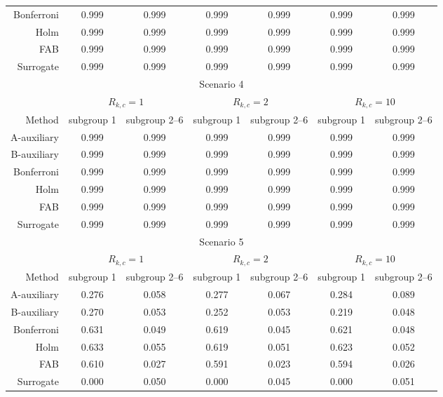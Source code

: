 \begin{tabular}{rcccccc}
 Bonferroni &0.999 & 0.999 &0.999 & 0.999 &0.999 & 0.999 \\ 
Holm &0.999 & 0.999 &0.999 & 0.999 &0.999 & 0.999 \\ 
FAB &0.999 & 0.999 &0.999 & 0.999 &0.999 & 0.999 \\ 
Surrogate &0.999 & 0.999 &0.999 & 0.999 &0.999 & 0.999 \\ 
\bottomrule 
\multicolumn{7}{c}{Scenario 4}\\ 
\midrule 
& \multicolumn{2}{c}{$R_{k,c} = 1$} & \multicolumn{2}{c}{$R_{k,c} = 2$} & \multicolumn{2}{c}{$R_{k,c} = 10$} \\ 
Method  & subgroup 1 & subgroup 2--6 & subgroup 1 & subgroup 2--6 & subgroup 1 & subgroup 2--6 \\ 
A-auxiliary &0.999 & 0.999 &0.999 & 0.999 &0.999 & 0.999 \\ 
 B-auxiliary &0.999 & 0.999 &0.999 & 0.999 &0.999 & 0.999 \\ 
 Bonferroni &0.999 & 0.999 &0.999 & 0.999 &0.999 & 0.999 \\ 
Holm &0.999 & 0.999 &0.999 & 0.999 &0.999 & 0.999 \\ 
FAB &0.999 & 0.999 &0.999 & 0.999 &0.999 & 0.999 \\ 
Surrogate &0.999 & 0.999 &0.999 & 0.999 &0.999 & 0.999 \\ 
\bottomrule\multicolumn{7}{c}{Scenario 5}\\ 
\midrule 
& \multicolumn{2}{c}{$R_{k,c} = 1$} & \multicolumn{2}{c}{$R_{k,c} = 2$} & \multicolumn{2}{c}{$R_{k,c} = 10$} \\ 
Method  & subgroup 1 & subgroup 2--6 & subgroup 1 & subgroup 2--6 & subgroup 1 & subgroup 2--6 \\ 
A-auxiliary &0.276 & 0.058 &0.277 & 0.067 &0.284 & 0.089 \\ 
 B-auxiliary &0.270 & 0.053 &0.252 & 0.053 &0.219 & 0.048 \\ 
 Bonferroni &0.631 & 0.049 &0.619 & 0.045 &0.621 & 0.048 \\ 
Holm &0.633 & 0.055 &0.619 & 0.051 &0.623 & 0.052 \\ 
FAB &0.610 & 0.027 &0.591 & 0.023 &0.594 & 0.026 \\ 
Surrogate &0.000 & 0.050 &0.000 & 0.045 &0.000 & 0.051 \\ 
\bottomrule 
\end{tabular}